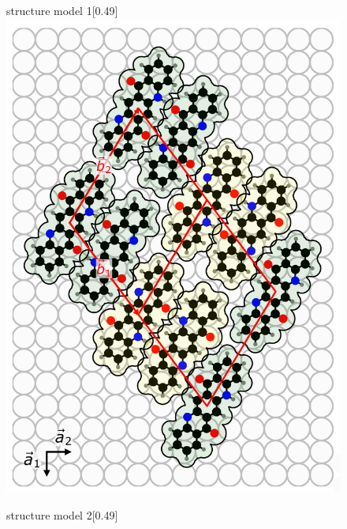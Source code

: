 \begin{figure}[htb]
	\centering
	\begin{subcaptionbox}{structure model 1}[0.49\linewidth]
		{\includegraphics[width=\linewidth]{images/QA-beta-Ag(100)-Version1.pdf}}
	\end{subcaptionbox}
	\hfill
	\begin{subcaptionbox}{structure model 2}[0.49\linewidth]

\end{subcaptionbox}
\end{figure}
